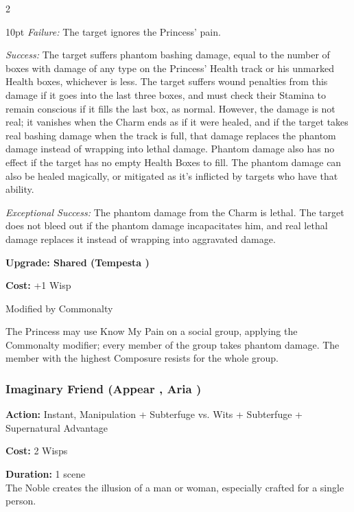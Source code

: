 \begin{multicols}{2}
\begin{myindentpar}{10pt}
    \emph{Failure:} The target ignores the Princess' pain.

    \emph{Success:} The target suffers phantom bashing damage, equal to the number of boxes with damage of any type on the Princess' Health track or his unmarked Health boxes, whichever is less. The target suffers wound penalties from this damage if it goes into the last three boxes, and must check their Stamina to remain conscious if it fills the last box, as normal. However, the damage is not real; it vanishes when the Charm ends as if it were healed, and if the target takes real bashing damage when the track is full, that damage replaces the phantom damage instead of wrapping into lethal damage. Phantom damage also has no effect if the target has no empty Health Boxes to fill. The phantom damage can also be healed magically, or mitigated as it's inflicted by targets who have that ability.

    \emph{Exceptional Success:} The phantom damage from the Charm is lethal. The target does not bleed out if the phantom damage incapacitates him, and real lethal damage replaces it instead of wrapping into aggravated damage. 

\textbf{Upgrade: Shared (Tempesta \textbullet\textbullet\textbullet)}

\noindent \textbf{Cost:} +1 Wisp

\noindent Modified by Commonalty

The Princess may use Know My Pain on a social group, applying the Commonalty modifier; every member of the group takes phantom damage. The member with the highest Composure resists for the whole group.

\end{myindentpar}

\subsubsection*{Imaginary Friend (Appear \textbullet\textbullet\textbullet\textbullet, Aria \textbullet\textbullet\textbullet)}

\noindent \textbf{Action:} Instant, Manipulation + Subterfuge vs. Wits + Subterfuge + Supernatural Advantage

\noindent \textbf{Cost:} 2 Wisps

\noindent \textbf{Duration:} 1 scene\\

\noindent The Noble creates the illusion of a man or woman, especially crafted for a single person.


\end{multicols}
